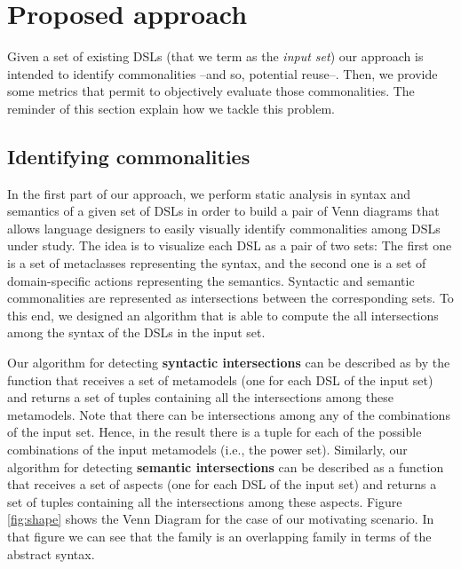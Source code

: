 \section{Proposed approach}
\label{sec:apprach}

Given a set of existing DSLs (that we term as the \textit{input set}) our approach is intended to identify commonalities --and so, potential reuse--. Then, we provide some metrics that permit to objectively evaluate those commonalities. The reminder of this section explain how we tackle this problem.

\subsection{Identifying commonalities}
\label{sec:metrics}

In the first part of our approach, we perform static analysis in syntax and semantics of a given set of DSLs in order to build a pair of Venn diagrams that allows language designers to easily visually identify commonalities among DSLs under study. The idea is to visualize each DSL as a pair of two sets: The first one is a set of metaclasses representing the syntax, and the second one is a set of domain-specific actions representing the semantics. Syntactic and semantic commonalities are represented as intersections between the corresponding sets. To this end, we designed an algorithm that is able to compute the all intersections among the syntax of the DSLs in the input set. 

Our algorithm for detecting \textbf{syntactic intersections} can be described as by the function that receives a set of metamodels (one for each DSL of the input set) and returns a set of tuples containing all the intersections among these metamodels. Note that there can be intersections among any of the combinations of the input set. Hence, in the result there is a tuple for each of the possible combinations of the input metamodels (i.e., the power set). Similarly, our algorithm for detecting \textbf{semantic intersections} can be described as a function that receives a set of aspects (one for each DSL of the input set) and returns a set of tuples containing all the intersections among these aspects. Figure \ref{fig:shape} shows the Venn Diagram for the case of our motivating scenario. In that figure we can see that the family is an overlapping family in terms of the abstract syntax. 

